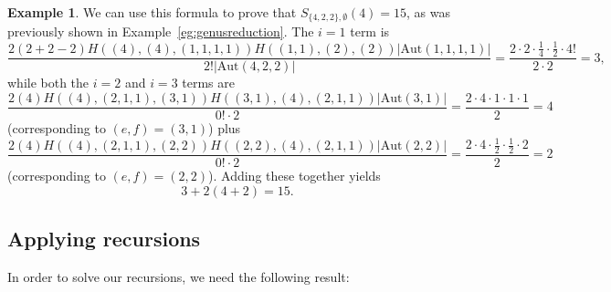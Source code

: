 \documentclass[11pt]{article}           %
\newcommand{\Aut}{\text{Aut}}
\theoremstyle{definition}
\newtheorem{eg}{Example}[section]
\begin{document}
\begin{eg}
  We can use this formula to prove that $S_{\{4,2,2\},\emptyset}(4)=15$, as was previously shown in
  Example~\ref{eg:genusreduction}.
  The $i=1$ term is
  \[
  \frac{2(2+2-2)H((4),(4),(1,1,1,1))H((1,1),(2),(2))|\Aut(1,1,1,1)|}{2!|\Aut(4,2,2)|} =\frac{2\cdot 2\cdot \frac 14\cdot \frac 12\cdot 4!}{2\cdot 2}=3,
  \]
  while both the $i=2$ and $i=3$ terms are
  \[
  \frac{2(4)H((4),(2,1,1),(3,1))H((3,1),(4),(2,1,1))|\Aut(3,1)|}{0!\cdot 2}=\frac{2\cdot 4\cdot 1\cdot 1\cdot 1}{2}=4
  \]
  (corresponding to $(e,f)=(3,1)$) plus
  \[
  \frac{2(4)H((4),(2,1,1),(2,2))H((2,2),(4),(2,1,1))|\Aut(2,2)|}{0!\cdot 2}=\frac{2\cdot 4\cdot \frac 12\cdot \frac 12\cdot 2}{2}=2
  \]
  (corresponding to $(e,f)=(2,2)$). Adding these together yields
  \[
  3+2(4+2)=15.
  \]
  \end{eg}

\subsection{Applying recursions}

In order to solve our recursions, we need the following result:
\end{document}
